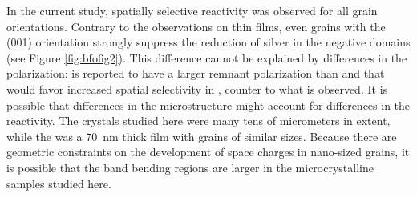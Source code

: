 In the current study, spatially selective reactivity was observed for all grain orientations. Contrary to the observations on  thin films, even grains with the (001) orientation strongly suppress the reduction of silver in the negative domains (see Figure \ref{fig:bfofig2}). This difference cannot be explained by differences in the polarization:  is reported to have a larger remnant polarization than  and that would favor increased spatial selectivity in , counter to what is observed.\cite{Kobayashi:2005wx} It is possible that differences in the microstructure might account for differences in the reactivity. The  crystals studied here were many tens of micrometers in extent, while the  was a \SI{70}{\nano\meter} thick film with grains of similar sizes.\cite{Dunn:2007cx} Because there are geometric constraints on the development of space charges in nano-sized grains, it is possible that the band bending regions are larger in the microcrystalline  samples studied here.\cite{ALBERY:1984tu}


